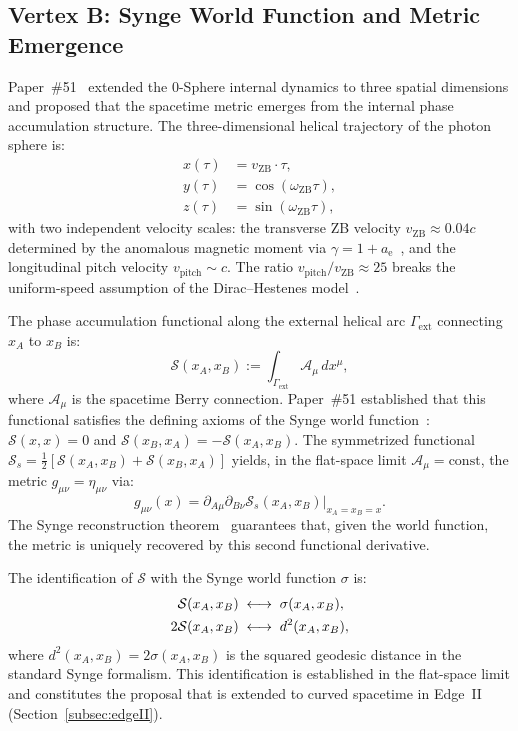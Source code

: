 \documentclass[%
 reprint, amsmath,amssymb, aps, prd, ]{revtex4-2}
\numberwithin{equation}{section}
\newcommand{\omZB}{\omega_{\text{ZB}}}
\newcommand{\vZB}{v_{\mathrm{ZB}}}
\newcommand{\anom}{a_{\mathrm{e}}}
\newcommand{\BerryA}{\mathcal{A}}
\newcommand{\SyngeS}{\mathcal{S}}
\begin{document}
\subsection{Vertex B: Synge World Function and Metric Emergence}
\label{subsec:vertexB}

Paper~\#51~\cite{hanamura51} extended the 0-Sphere internal dynamics to three spatial dimensions and proposed that the spacetime metric emerges from the internal phase accumulation structure.
The three-dimensional helical trajectory of the photon sphere is:
\begin{align}
x(\tau) &= \vZB \cdot \tau, \\
y(\tau) &= \cos(\omZB \tau), \\
z(\tau) &= \sin(\omZB \tau),
\end{align}
with two independent velocity scales: the transverse ZB velocity $\vZB \approx 0.04c$ determined by the anomalous magnetic moment via $\gamma = 1 + \anom$~\cite{hanamura10}, and the longitudinal pitch velocity $v_\mathrm{pitch} \sim c$.
The ratio $v_\mathrm{pitch}/\vZB \approx 25$ breaks the uniform-speed assumption of the Dirac--Hestenes model~\cite{Dirac1928,Hestenes1990}.

The phase accumulation functional along the external helical arc $\Gamma_\mathrm{ext}$ connecting $x_A$ to $x_B$ is:
\begin{equation}
\SyngeS(x_A, x_B) := \int_{\Gamma_\mathrm{ext}} \BerryA_\mu \, dx^\mu,
\label{eq:phase_functional}
\end{equation}
where $\BerryA_\mu$ is the spacetime Berry connection.
Paper~\#51 established that this functional satisfies the defining axioms of the Synge world function~\cite{Synge1960}: $\SyngeS(x,x) = 0$ and $\SyngeS(x_B,x_A) = -\SyngeS(x_A,x_B)$.
The symmetrized functional $\SyngeS_s = \tfrac{1}{2}[\SyngeS(x_A,x_B) + \SyngeS(x_B,x_A)]$ yields, in the flat-space limit $\BerryA_\mu = \mathrm{const}$, the metric $g_{\mu\nu} = \eta_{\mu\nu}$ via:
\begin{equation}
g_{\mu\nu}(x) = \partial_{A\mu}\partial_{B\nu}\SyngeS_s(x_A,x_B)\big|_{x_A = x_B = x}.
\label{eq:metric_proposal}
\end{equation}
The Synge reconstruction theorem~\cite{Synge1960} guarantees that, given the world function, the metric is uniquely recovered by this second functional derivative.

The identification of $\SyngeS$ with the Synge world function $\sigma$ is:
\begin{align}
\SyngeS(x_A,x_B) &\;\longleftrightarrow\; \sigma(x_A,x_B),
\label{eq:synge_id}\\
2\SyngeS(x_A,x_B) &\;\longleftrightarrow\; d^2(x_A,x_B),
\notag
\end{align}
where $d^2(x_A,x_B) = 2\sigma(x_A,x_B)$ is the squared geodesic distance in the standard Synge formalism.
This identification is established in the flat-space limit and constitutes the proposal that is extended to curved spacetime in Edge~II (Section~\ref{subsec:edgeII}).
\end{document}
